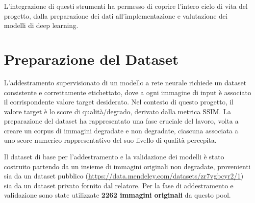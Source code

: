 L'integrazione di questi strumenti ha permesso di coprire l'intero ciclo di vita del progetto, dalla preparazione dei dati all'implementazione e valutazione dei modelli di deep learning.


\section{Preparazione del Dataset}

L'addestramento supervisionato di un modello a rete neurale richiede un dataset consistente e correttamente etichettato, dove a ogni immagine di input è associato il corrispondente valore target desiderato. Nel contesto di questo progetto, il valore target è lo score di qualità/degrado, derivato dalla metrica SSIM. La preparazione del dataset ha rappresentato una fase cruciale del lavoro, volta a creare un corpus di immagini degradate e non degradate, ciascuna associata a uno score numerico rappresentativo del suo livello di qualità percepita.

Il dataset di base per l'addestramento e la validazione dei modelli è stato costruito partendo da un insieme di immagini originali non degradate, provenienti sia da un dataset pubblico (\url{https://data.mendeley.com/datasets/zr7vgbcyr2/1}) sia da un dataset privato fornito dal relatore. Per la fase di addestramento e validazione sono state utilizzate \textbf{2262 immagini originali} da questo pool.

